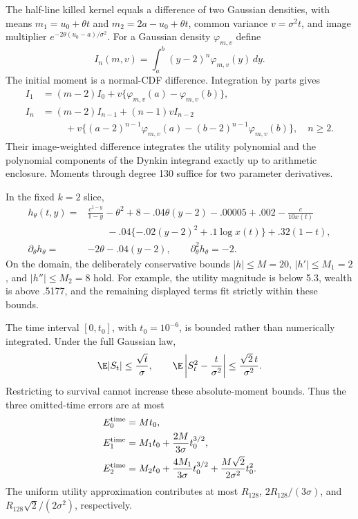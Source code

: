 The half-line killed kernel equals a difference of two Gaussian densities, with means $m_1=u_0+\theta t$ and $m_2=2a-u_0+\theta t$, common variance $v=\sigma^2t$, and image multiplier $e^{-2\theta(u_0-a)/\sigma^2}$. For a Gaussian density $\varphi_{m,v}$ define
\begin{equation}
 I_n(m,v)=\int_a^b(y-2)^n\varphi_{m,v}(y)\,dy.
\end{equation}
The initial moment is a normal-CDF difference. Integration by parts gives
\begin{align}
 I_1&=(m-2)I_0+v\{\varphi_{m,v}(a)-\varphi_{m,v}(b)\},\\
 I_n&=(m-2)I_{n-1}+(n-1)vI_{n-2}\\
 &\hspace{1cm}+v\{(a-2)^{n-1}\varphi_{m,v}(a)-(b-2)^{n-1}\varphi_{m,v}(b)\},\quad n\ge2.\nonumber
\end{align}
Their image-weighted difference integrates the utility polynomial and the polynomial components of the Dynkin integrand exactly up to arithmetic enclosure. Moments through degree 130 suffice for two parameter derivatives.

In the fixed $k=2$ slice,
\begin{align}
 h_\theta(t,y)={}&\frac{c^{1-y}}{1-y}-\theta^2+8-.04\theta(y-2)-.00005+.002-\frac{c}{10x(t)}\\
 &\qquad -.04\{- .02(y-2)^2+.1\log x(t)\}+.32(1-t),\nonumber\\
 \partial_\theta h_\theta={}&-2\theta-.04(y-2),\qquad
 \partial_\theta^2h_\theta=-2.
\end{align}
On the domain, the deliberately conservative bounds $|h|\le M=20$, $|h'|\le M_1=2$, and $|h''|\le M_2=8$ hold. For example, the utility magnitude is below 5.3, wealth is above .5177, and the remaining displayed terms fit strictly within these bounds.

The time interval $[0,t_0]$, with $t_0=10^{-6}$, is bounded rather than numerically integrated. Under the full Gaussian law,
\begin{equation}
 \E|S_t|\le\frac{\sqrt t}{\sigma},\qquad
 \E\left|S_t^2-\frac{t}{\sigma^2}\right|\le\frac{\sqrt2\,t}{\sigma^2}.
\end{equation}
Restricting to survival cannot increase these absolute-moment bounds. Thus the three omitted-time errors are at most
\begin{align}
 E_0^{\rm time}&=Mt_0,\\
 E_1^{\rm time}&=M_1t_0+\frac{2M}{3\sigma}t_0^{3/2},\\
 E_2^{\rm time}&=M_2t_0+\frac{4M_1}{3\sigma}t_0^{3/2}+\frac{M\sqrt2}{2\sigma^2}t_0^2.
\end{align}
The uniform utility approximation contributes at most $R_{128}$, $2R_{128}/(3\sigma)$, and $R_{128}\sqrt2/(2\sigma^2)$, respectively.


